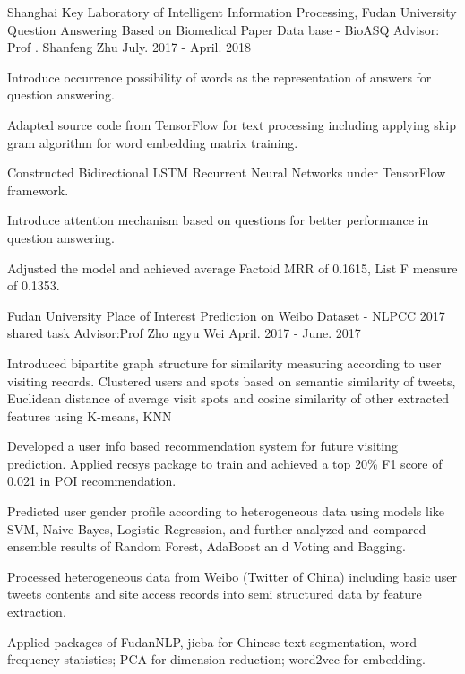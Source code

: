\begin{cventries}
      \cventry
     {Shanghai Key Laboratory of Intelligent Information Processing, Fudan University} 
    {Question Answering Based on Biomedical Paper Data base - BioASQ} %
    {Advisor: Prof . Shanfeng Zhu} %
    {July. 2017 - April. 2018} %
    {
      \begin{cvitems} %
	\item {Introduce occurrence possibility of words as the representation of answers for question answering.}
	\item {Adapted source code from TensorFlow for text processing including applying skip gram algorithm for word embedding matrix training.}
	\item {Constructed Bidirectional LSTM Recurrent Neural Networks under TensorFlow framework.}
	\item {Introduce attention mechanism based on questions for better performance in question answering.}
	\item {Adjusted the model and achieved average Factoid MRR of 0.1615, List F measure of 0.1353.}
      \end{cvitems}
    }

    \cventry
     {Fudan University} 
    {Place of Interest Prediction on Weibo Dataset - NLPCC 2017 shared task} %
    {Advisor:Prof Zho ngyu Wei} %
    {April. 2017 - June. 2017} %
    {
      \begin{cvitems} %
	\item {Introduced bipartite graph structure for similarity measuring according to user visiting records. Clustered users and spots based on semantic similarity of tweets, Euclidean distance of average visit spots and cosine similarity of other extracted features using K-means, KNN}
	\item {Developed a user info based recommendation system for future visiting prediction. Applied recsys package to train and achieved a top 20\% F1 score of 0.021 in POI recommendation.}
	\item {Predicted user gender profile according to heterogeneous data using models like SVM, Naive Bayes, Logistic Regression, and further analyzed and compared ensemble results of Random Forest, AdaBoost an d Voting and Bagging.}
	\item {Processed heterogeneous data from Weibo (Twitter of China) including basic user tweets contents and site access records into semi structured data by feature extraction.}
	\item {Applied packages of FudanNLP, jieba for Chinese text segmentation, word frequency statistics; PCA for dimension reduction; word2vec for embedding.}
      \end{cvitems}
    }
    

\end{cventries}

